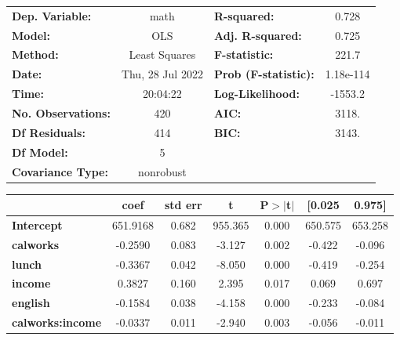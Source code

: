 \begin{center}
\begin{tabular}{lclc}
\toprule
\textbf{Dep. Variable:}    &       math       & \textbf{  R-squared:         } &     0.728   \\
\textbf{Model:}            &       OLS        & \textbf{  Adj. R-squared:    } &     0.725   \\
\textbf{Method:}           &  Least Squares   & \textbf{  F-statistic:       } &     221.7   \\
\textbf{Date:}             & Thu, 28 Jul 2022 & \textbf{  Prob (F-statistic):} & 1.18e-114   \\
\textbf{Time:}             &     20:04:22     & \textbf{  Log-Likelihood:    } &   -1553.2   \\
\textbf{No. Observations:} &         420      & \textbf{  AIC:               } &     3118.   \\
\textbf{Df Residuals:}     &         414      & \textbf{  BIC:               } &     3143.   \\
\textbf{Df Model:}         &           5      & \textbf{                     } &             \\
\textbf{Covariance Type:}  &    nonrobust     & \textbf{                     } &             \\
\bottomrule
\end{tabular}
\begin{tabular}{lcccccc}
                         & \textbf{coef} & \textbf{std err} & \textbf{t} & \textbf{P$> |$t$|$} & \textbf{[0.025} & \textbf{0.975]}  \\
\midrule
\textbf{Intercept}       &     651.9168  &        0.682     &   955.365  &         0.000        &      650.575    &      653.258     \\
\textbf{calworks}        &      -0.2590  &        0.083     &    -3.127  &         0.002        &       -0.422    &       -0.096     \\
\textbf{lunch}           &      -0.3367  &        0.042     &    -8.050  &         0.000        &       -0.419    &       -0.254     \\
\textbf{income}          &       0.3827  &        0.160     &     2.395  &         0.017        &        0.069    &        0.697     \\
\textbf{english}         &      -0.1584  &        0.038     &    -4.158  &         0.000        &       -0.233    &       -0.084     \\
\textbf{calworks:income} &      -0.0337  &        0.011     &    -2.940  &         0.003        &       -0.056    &       -0.011     \\

\end{tabular}
\end{center}
